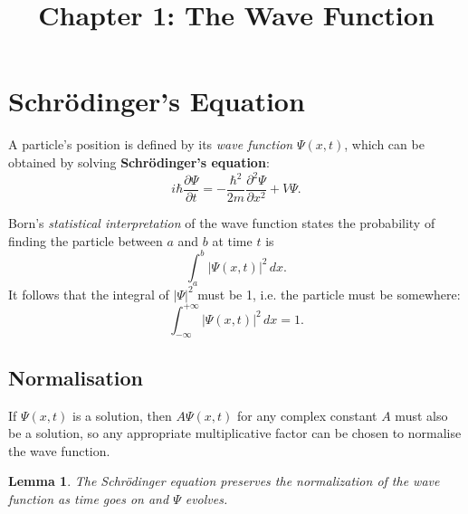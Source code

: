 \documentclass{article}
\newtheorem*{lemma*}{Lemma}
\begin{document}
\title{Chapter 1: The Wave Function}
\maketitle

\section{Schr\"{o}dinger's Equation}

A particle's position is defined by its \emph{wave function} $\Psi(x, t)$,
which can be obtained by solving \textbf{Schr\"{o}dinger's equation}:
\begin{equation} \label{eq:sch-eqn}
  \boxed{
    i\hbar \frac{\partial \Psi}{\partial t}
    = -\frac{\hbar^2}{2m} \frac{\partial^2 \Psi}{\partial x^2} + V\Psi.
  }
\end{equation}

Born's \emph{statistical interpretation} of the wave function states the
probability of finding the particle between $a$ and $b$ at time $t$ is \[
  \int_a^b |\Psi(x, t)|^2 \,dx.
\] It follows that the integral of $|\Psi|^2$
must be 1, i.e. the particle must be somewhere:
\begin{equation} \label{eq:sch-prob}
  \boxed{
    \int_{-\infty}^{+\infty} |\Psi(x, t)|^2 \,dx = 1.
  }
\end{equation}

\subsection{Normalisation}

If $\Psi(x, t)$ is a solution, then $A \Psi(x, t)$ for any complex constant $A$
must also be a solution, so any appropriate multiplicative factor can be chosen
to normalise the wave function.

\begin{lemma*}
  The Schr\"{o}dinger equation preserves the normalization of the wave function
  as time goes on and $\Psi$ evolves.
\end{lemma*}
\end{document}
